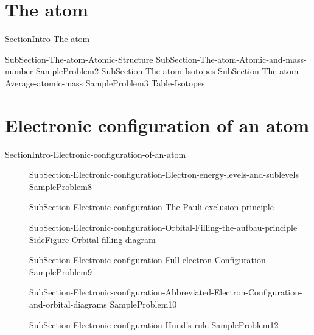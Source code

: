 \documentclass[main.tex]{subfiles}
\newcommand\chapterlabel{ChMIX-biomoleculesinsolution}\setcounter{figurenewcounter}{0}\setcounter{tablenewcounter}{0}\setcounter{formulanewcounter}{0}
\begin{document}
\section{\faEnvira The atom}
{SectionIntro-The-atom}
\sloppy\begin{description}
{SubSection-The-atom-Atomic-Structure}
{SubSection-The-atom-Atomic-and-mass-number}
{SampleProblem2}
{SubSection-The-atom-Isotopes}
{SubSection-The-atom-Average-atomic-mass}
{SampleProblem3}
 {Table-Isotopes}
\end{description}






\renewcommand\chapterlabel{Ch-radiation}
\section{\faTint Electronic configuration of an atom}{SectionIntro-Electronic-configuration-of-an-atom}
\sloppy\begin{description}
\item[] {SubSection-Electronic-configuration-Electron-energy-levels-and-sublevels}
  {SampleProblem8}
\item[] {SubSection-Electronic-configuration-The-Pauli-exclusion-principle}
     \label{Fig:{\chapterlabel}\thefigurenewcounter} 
\item[]{SubSection-Electronic-configuration-Orbital-Filling-the-aufbau-principle}
{SideFigure-Orbital-filling-diagram}
 \item[] {SubSection-Electronic-configuration-Full-electron-Configuration}
  {SampleProblem9}
\item[] 
{SubSection-Electronic-configuration-Abbreviated-Electron-Configuration-and-orbital-diagrams}
  {SampleProblem10}
  \item[] {SubSection-Electronic-configuration-Hund's-rule}
{SampleProblem12}
\end{description}
\end{document}
